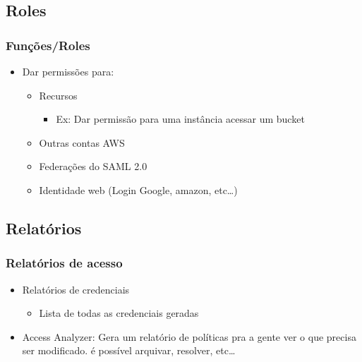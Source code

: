 \subsection{Roles}

\begin{frame}
	\frametitle{Funções/Roles}
	\begin{itemize}
		\item Dar permissões para:
			\begin{itemize}
				\item Recursos
				\begin{itemize}
					\item Ex: Dar permissão para uma instância acessar um bucket
				\end{itemize}
				\item Outras contas AWS
				\item Federações do SAML 2.0
				\item Identidade web (Login Google, amazon, etc\dots)
			\end{itemize}
	\end{itemize}
\end{frame}

\subsection{Relatórios}

\begin{frame}
	\frametitle{Relatórios de acesso}
	\begin{itemize}
		\item Relatórios de credenciais
			\begin{itemize}
				\item Lista de todas as credenciais geradas
			\end{itemize}
		\item Access Analyzer: Gera um relatório de políticas pra a gente ver o que precisa ser modificado. é possível arquivar, resolver, etc\dots
	\end{itemize}
\end{frame}
